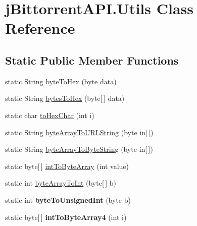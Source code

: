 \hypertarget{classj_bittorrent_a_p_i_1_1_utils}{
\section{jBittorrentAPI.Utils Class Reference}
\label{classj_bittorrent_a_p_i_1_1_utils}
}
\subsection*{Static Public Member Functions}
\begin{DoxyCompactItemize}
\item 
static String \hyperlink{classj_bittorrent_a_p_i_1_1_utils_a41501f3bae8b3053a2bafb43e48fc51c}{byteToHex} (byte data)
\item 
static String \hyperlink{classj_bittorrent_a_p_i_1_1_utils_ae1ee27863feabe06ebda7c855645c326}{bytesToHex} (byte\mbox{[}$\,$\mbox{]} data)
\item 
static char \hyperlink{classj_bittorrent_a_p_i_1_1_utils_aba1a1c13f197274c7fd1ea8aa361c15f}{toHexChar} (int i)
\item 
static String \hyperlink{classj_bittorrent_a_p_i_1_1_utils_a23af68b4277c238ac14ca12808789f1a}{byteArrayToURLString} (byte in\mbox{[}$\,$\mbox{]})
\item 
static String \hyperlink{classj_bittorrent_a_p_i_1_1_utils_a9490bfe75f951ccdf9bbda8b462d77b9}{byteArrayToByteString} (byte in\mbox{[}$\,$\mbox{]})
\item 
static byte\mbox{[}$\,$\mbox{]} \hyperlink{classj_bittorrent_a_p_i_1_1_utils_a43e8192bb07c969b4ab77a2260f9f3c4}{intToByteArray} (int value)
\item 
static int \hyperlink{classj_bittorrent_a_p_i_1_1_utils_abc1701588e624f5f5be2906820ced349}{byteArrayToInt} (byte\mbox{[}$\,$\mbox{]} b)
\item 
\hypertarget{classj_bittorrent_a_p_i_1_1_utils_ac1444655baeb78ea97345bda311982c7}{
static int {\bfseries byteToUnsignedInt} (byte b)}
\label{classj_bittorrent_a_p_i_1_1_utils_ac1444655baeb78ea97345bda311982c7}

\item 
\hypertarget{classj_bittorrent_a_p_i_1_1_utils_a45f50594b82b839a3fa9dfdadaaa9ff7}{
static byte\mbox{[}$\,$\mbox{]} {\bfseries intToByteArray4} (int i)}
\label{classj_bittorrent_a_p_i_1_1_utils_a45f50594b82b839a3fa9dfdadaaa9ff7}


\end{DoxyCompactItemize}
